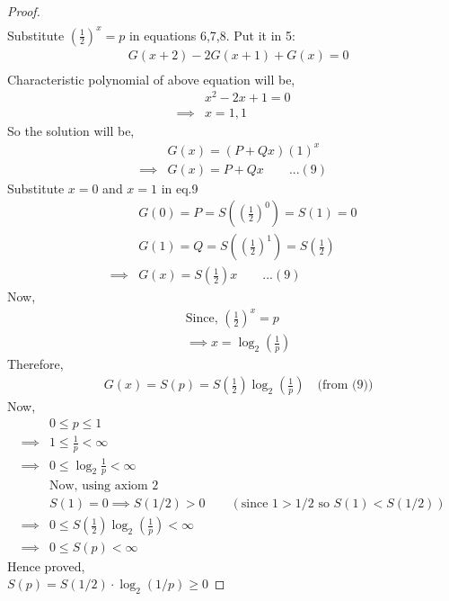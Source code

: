 \documentclass[12pt]{article}
\begin{document}
\begin{solution}
\begin{proof}
\begin{align*}
  \end{align*}
  Substitute $\left(\frac{1}{2}\right)^x=p$ in equations 6,7,8. Put it in 5:
  \begin{align*}
      &G(x+2)-2G(x+1)+G(x)=0\\
  \end{align*}
  Characteristic polynomial of above equation will be,
  \begin{align*}
      &x^2-2x+1=0\\
      \implies&x=1,1
  \end{align*}
  So the solution will be,
  \begin{align*}
      &G(x)= (P+Qx)(1)^x\\
     \implies&G(x)=P+Qx\quad\quad...(9)
  \end{align*}
  Substitute $x=0$ and $x=1$ in eq.9
  \begin{align*}
      &G(0)=P=S\left(\left(\frac{1}{2}\right)^0\right)=S(1)=0\\
      &G(1)=Q=S\left(\left(\frac{1}{2}\right)^1\right)=S\left(\frac{1}{2}\right)\\
      \implies& G(x)=S\left(\frac{1}{2}\right)x\quad\quad...(9)
  \end{align*}
  Now,
  \begin{align*}
      &\textrm{Since, }\left(\frac{1}{2}\right)^x=p\\
      &\implies x=\log_2\left(\frac{1}{p}\right)
  \end{align*}
  Therefore, 
  \begin{align*}
      &G(x)=S(p)=S\left(\frac{1}{2}\right) \log_2\left(\frac{1}{p}\right)\quad(\textrm{from (9))}
  \end{align*}
  Now,
  \begin{align*}
      &0\leq p\leq 1\\
      \implies& 1\leq \frac{1}{p} <\infty\\
      \implies& 0\leq \log_2\frac{1}{p} <\infty\\
      &\textrm{Now, using axiom 2}\\
      & S(1)=0 \implies S(1/2)>0\quad\quad(\text{since $1>1/2$ so $S(1)<S(1/2)$})\\
      \implies& 0\leq S\left(\frac{1}{2}\right)\log_2\left(\frac{1}{p}\right) <\infty\\
      \implies& 0\leq S(p) <\infty
      \end{align*}
      Hence proved,\\
          $S(p) = S(1/2) \cdot \log_2 (1/p) \geq 0$
      \end{proof}
  \end{solution}
  
\end{document}

